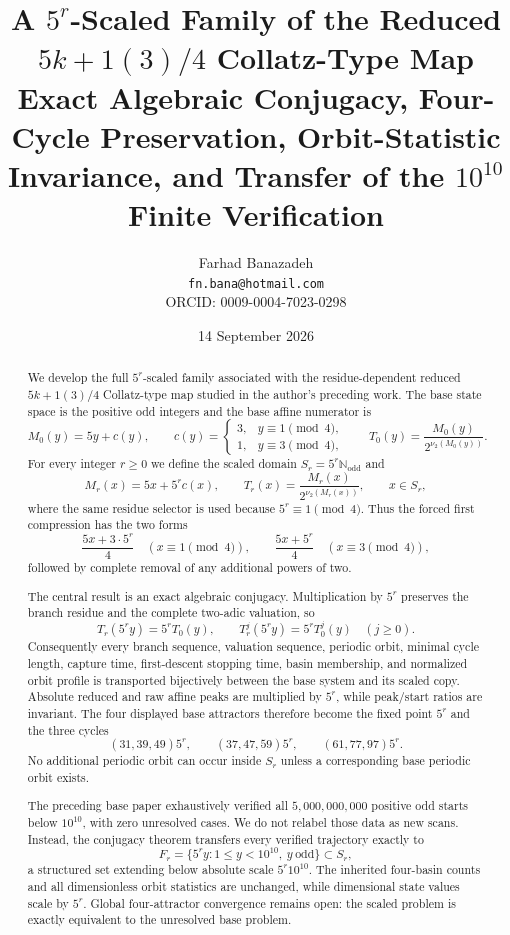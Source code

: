 \documentclass[11pt]{article}
\title{A $5^r$-Scaled Family of the Reduced $5k+1(3)/4$ Collatz-Type Map\\\large Exact Algebraic Conjugacy, Four-Cycle Preservation, Orbit-Statistic Invariance, and Transfer of the $10^{10}$ Finite Verification}
\author{Farhad Banazadeh\\\texttt{fn.bana@hotmail.com}\\ORCID: 0009-0004-7023-0298}
\date{14 September 2026}
\newcommand{\vTwo}{\nu_2}
\newcommand{\Odd}{\mathbb N_{\mathrm{odd}}}
\begin{document}
\maketitle

\begin{abstract}
We develop the full $5^r$-scaled family associated with the residue-dependent reduced $5k+1(3)/4$ Collatz-type map studied in the author's preceding work. The base state space is the positive odd integers and the base affine numerator is
\[
M_0(y)=5y+c(y),\qquad
c(y)=\begin{cases}3,&y\equiv1\pmod4,\\1,&y\equiv3\pmod4,\end{cases}
\qquad
T_0(y)=\frac{M_0(y)}{2^{\vTwo(M_0(y))}}.
\]
For every integer $r\ge0$ we define the scaled domain $S_r=5^r\Odd$ and
\[
M_r(x)=5x+5^r c(x),\qquad
T_r(x)=\frac{M_r(x)}{2^{\vTwo(M_r(x))}},\qquad x\in S_r,
\]
where the same residue selector is used because $5^r\equiv1\pmod4$. Thus the forced first compression has the two forms
\[
\frac{5x+3\cdot5^r}{4}\quad(x\equiv1\!\!\pmod4),\qquad
\frac{5x+5^r}{4}\quad(x\equiv3\!\!\pmod4),
\]
followed by complete removal of any additional powers of two.

The central result is an exact algebraic conjugacy. Multiplication by $5^r$ preserves the branch residue and the complete two-adic valuation, so
\[
T_r(5^r y)=5^rT_0(y),\qquad T_r^j(5^r y)=5^rT_0^j(y)\quad(j\ge0).
\]
Consequently every branch sequence, valuation sequence, periodic orbit, minimal cycle length, capture time, first-descent stopping time, basin membership, and normalized orbit profile is transported bijectively between the base system and its scaled copy. Absolute reduced and raw affine peaks are multiplied by $5^r$, while peak/start ratios are invariant. The four displayed base attractors therefore become the fixed point $5^r$ and the three cycles
\[
(31,39,49)5^r,\qquad(37,47,59)5^r,\qquad(61,77,97)5^r.
\]
No additional periodic orbit can occur inside $S_r$ unless a corresponding base periodic orbit exists.

The preceding base paper exhaustively verified all $5,000,000,000$ positive odd starts below $10^{10}$, with zero unresolved cases. We do not relabel those data as new scans. Instead, the conjugacy theorem transfers every verified trajectory exactly to
\[
F_r=\{5^r y:1\le y<10^{10},\ y\ \text{odd}\}\subset S_r,
\]
a structured set extending below absolute scale $5^r10^{10}$. The inherited four-basin counts and all dimensionless orbit statistics are unchanged, while dimensional state values scale by $5^r$. Global four-attractor convergence remains open: the scaled problem is exactly equivalent to the unresolved base problem.
\end{abstract}
\end{document}
